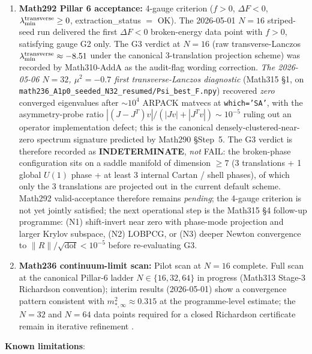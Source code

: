 \begin{enumerate}
\item \textbf{Math292 Pillar 6 acceptance:} 4-gauge criterion
($f > 0$, $\Delta F < 0$, $\lambda_{\min}^{\rm transverse} \geq 0$,
extraction\_status $=$ OK). The 2026-05-01 $N=16$ striped-seed run
delivered the first $\Delta F < 0$ broken-energy data point with
$f > 0$, satisfying gauge G2 only. The G3 verdict at $N=16$ (raw
transverse-Lanczos $\lambda_{\min}^{\rm transverse} \approx -8.51$
under the canonical 3-translation projection scheme) was recorded by
Math310-AddA as the audit-flag wording correction. \emph{The
2026-05-06 $N=32$, $\mu^2 = -0.7$ first transverse-Lanczos
diagnostic} (Math315 \S 1, on
\texttt{math236\_A1p0\_seeded\_N32\_resumed/Psi\_best\_F.npy})
recovered \emph{zero} converged eigenvalues after $\sim 10^{4}$
ARPACK matvecs at \texttt{which='SA'}, with the asymmetry-probe
ratio $|(J - J^T)v|/(|Jv| + |J^Tv|) \sim 10^{-5}$ ruling out an
operator implementation defect; this is the canonical
densely-clustered-near-zero spectrum signature predicted by Math290
\S Step~5. The G3 verdict is therefore recorded as
\textbf{INDETERMINATE}, \emph{not} FAIL: the broken-phase
configuration sits on a saddle manifold of dimension $\geq 7$
(3 translations + 1 global $U(1)$ phase + at least $3$ internal
Cartan / shell phases), of which only the 3 translations are
projected out in the current default scheme. Math292
valid-acceptance therefore remains \emph{pending}; the 4-gauge
criterion is not yet jointly satisfied; the next operational step is
the Math315 \S 4 follow-up programme: (N1) shift-invert near zero
with phase-mode projection and larger Krylov subspace, (N2) LOBPCG,
or (N3) deeper Newton convergence to
$\|R\|/\sqrt{\mathrm{dof}} < 10^{-5}$ before re-evaluating G3.

\item \textbf{Math236 continuum-limit scan:} Pilot scan at $N=16$ complete.
Full scan at the canonical Pillar-6 ladder $N \in \{16, 32, 64\}$ in
progress (Math313 Stage-3 Richardson convention); interim results
(2026-05-01) show a convergence pattern consistent with
$m_{*,\infty}^{2} \approx 0.315$ at the programme-level estimate; the
$N=32$ and $N=64$ data points required for a closed Richardson
certificate remain in iterative refinement \cite{Math236}.
\end{enumerate}

\textbf{Known limitations}:

